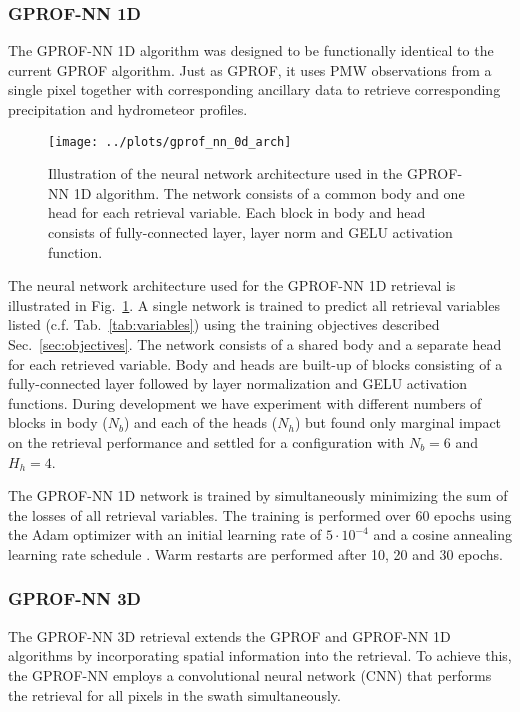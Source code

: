 \documentclass[a4paper,11pt,bibtotoc]{scrartcl}
\begin{document}
\subsubsection{GPROF-NN 1D}

The GPROF-NN 1D algorithm was designed to be functionally identical to the
current GPROF algorithm. Just as GPROF, it uses PMW observations from a single
pixel together with corresponding ancillary data to retrieve corresponding
precipitation and hydrometeor profiles.

\begin{figure}[hbpt]
  \centering
    \texttt{[image: ../plots/gprof\_nn\_0d\_arch]}
    \caption{Illustration of the neural network architecture used in the
      GPROF-NN 1D algorithm. The network consists of a common body and
      one head for each retrieval variable. Each block in body and head
      consists of fully-connected layer, layer norm and GELU activation function.
    }
  \label{fig:gprof_nn_1d}
\end{figure}

The neural network architecture used for the GPROF-NN 1D retrieval is
illustrated in Fig.~\ref{fig:gprof_nn_1d}. A single network is trained to
predict all retrieval variables listed (c.f. Tab.~\ref{tab:variables}) using the
training objectives described Sec.~\ref{sec:objectives}. The network consists of
a shared body and a separate head for each retrieved variable. Body and heads
are built-up of blocks consisting of a fully-connected layer followed by
layer normalization \citep{ba16} and GELU \citep{hendrycks16} activation
functions. During development we have experiment with different numbers of blocks
in body ($N_b$) and each of the heads ($N_h$) but found only marginal impact on
the retrieval performance and settled for a configuration with $N_b = 6$ and
$H_h = 4$.

The GPROF-NN 1D network is trained by simultaneously minimizing the sum of the
losses of all retrieval variables. The training is performed over 60 epochs
using the Adam optimizer \citep{kingma14} with an initial learning rate of
$5\cdot10^{-4}$ and a cosine annealing learning rate schedule
\citep{loshchilov16}. Warm restarts are performed after 10, 20 and 30 epochs.


\subsubsection{GPROF-NN 3D}

The GPROF-NN 3D retrieval extends the GPROF and GPROF-NN 1D algorithms by
incorporating spatial information into the retrieval. To achieve this,
the GPROF-NN employs a convolutional neural network (CNN) that performs
the retrieval for all pixels in the swath simultaneously.
\end{document}
